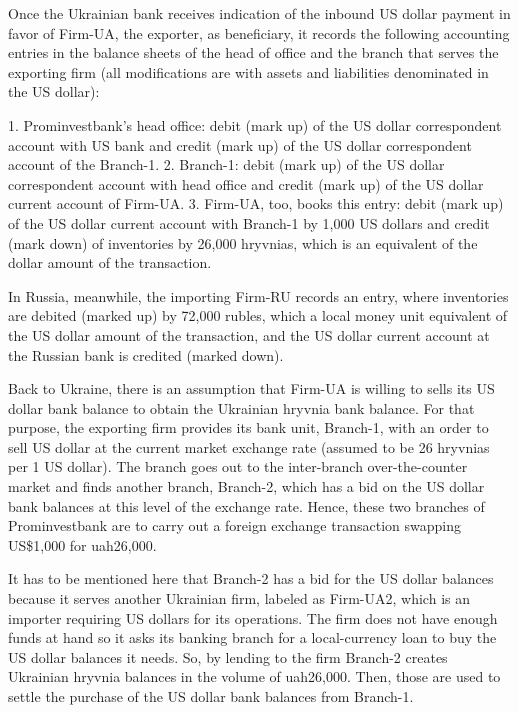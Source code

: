 Once the Ukrainian bank receives indication of the inbound US dollar payment in favor of Firm-UA, the exporter, as beneficiary, it records the following accounting entries in the balance sheets of the head of office and the branch that serves the exporting firm (all modifications are with assets and liabilities denominated in the US dollar): \par

1. Prominvestbank's head office: debit (mark up) of the US dollar correspondent account with US bank and credit (mark up) of the US dollar correspondent account of the Branch-1.
2. Branch-1: debit (mark up) of the US dollar correspondent account with head office and credit (mark up) of the US dollar current account of Firm-UA.
3. Firm-UA, too, books this entry: debit (mark up) of the US dollar current account with Branch-1 by 1,000 US dollars and credit (mark down) of inventories by 26,000 hryvnias, which is an equivalent of the dollar amount of the transaction.

In Russia, meanwhile, the importing Firm-RU records an entry, where inventories are debited (marked up) by 72,000 rubles, which a local money unit equivalent of the US dollar amount of the transaction, and the US dollar current account at the Russian bank is credited (marked down). \par

Back to Ukraine, there is an assumption that Firm-UA is willing to sells its US dollar bank balance to obtain the Ukrainian hryvnia bank balance. For that purpose, the exporting firm provides its bank unit, Branch-1, with an order to sell US dollar at the current market exchange rate (assumed to be 26 hryvnias per 1 US dollar). The branch goes out to the inter-branch over-the-counter market and finds another branch, Branch-2, which has a bid on the US dollar bank balances at this level of the exchange rate. Hence, these two branches of Prominvestbank are to carry out a foreign exchange transaction swapping US\$1,000 for \ac{uah}26,000. \par

It has to be mentioned here that Branch-2 has a bid for the US dollar balances because it serves another Ukrainian firm, labeled as Firm-UA2, which is an importer requiring US dollars for its operations. The firm does not have enough funds at hand so it asks its banking branch for a local-currency loan to buy the US dollar balances it needs. So, by lending to the firm Branch-2 creates Ukrainian hryvnia balances in the volume of \ac{uah}26,000. Then, those are used to settle the purchase of the US dollar bank balances from Branch-1. \par

